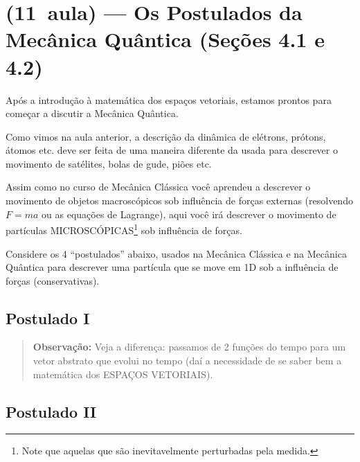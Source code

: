 \usetikzlibrary{decorations.pathreplacing}

\section*{(11\textordfeminine\ aula) --- Os Postulados da Mecânica Quântica (Seções 4.1 e 4.2)}

Após a introdução à matemática dos espaços vetoriais, estamos prontos para começar a discutir a Mecânica Quântica.

Como vimos na aula anterior, a descrição da dinâmica de elétrons, prótons, átomos etc. deve ser feita de uma maneira diferente da usada para descrever o movimento de satélites, bolas de gude, piões etc.

Assim como no curso de Mecânica Clássica você aprendeu a descrever o movimento de objetos macroscópicos sob influência de forças externas (resolvendo $F=ma$ ou as equações de Lagrange), aqui você irá descrever o movimento de partículas MICROSCÓPICAS\footnote{Note que aquelas que são inevitavelmente perturbadas pela medida.} sob influência de forças.

Considere os 4 ``postulados'' abaixo, usados na Mecânica Clássica e na Mecânica Quântica para descrever uma partícula que se move em 1D sob a influência de forças (conservativas).

\subsection*{Postulado I}


\begin{quote}
\textbf{Observação:} Veja a diferença: passamos de 2 funções do tempo para um vetor abstrato que evolui no tempo (daí a necessidade de se saber bem a matemática dos ESPAÇOS VETORIAIS).
\end{quote}

\subsection*{Postulado II}


